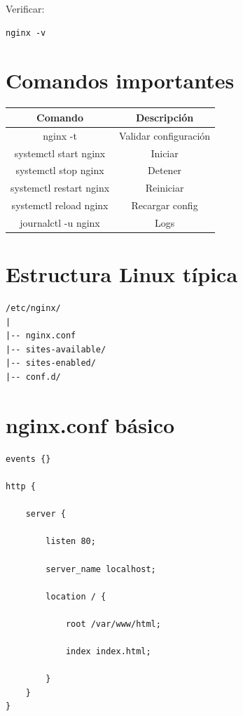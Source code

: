 \documentclass[a4paper,11pt]{article}
\begin{document}
Verificar:
\begin{lstlisting}
nginx -v
\end{lstlisting}


\section*{Comandos importantes}

\begin{center}
\begin{tabular}{| c | c |}
\hline
Comando & Descripción \\
\hline\hline
nginx -t & Validar configuración \\
\hline
systemctl start nginx & Iniciar \\
\hline
systemctl stop nginx & Detener \\
\hline
systemctl restart nginx & Reiniciar \\
\hline
systemctl reload nginx & Recargar config \\
\hline
journalctl -u nginx & Logs \\
\hline
\end{tabular}
\end{center}


\section*{Estructura Linux típica}

\begin{lstlisting}
/etc/nginx/
|
|-- nginx.conf
|-- sites-available/
|-- sites-enabled/
|-- conf.d/
\end{lstlisting}


\section*{nginx.conf básico}

\begin{lstlisting}
events {}

http {

    server {

        listen 80;

        server_name localhost;

        location / {

            root /var/www/html;

            index index.html;

        }
    }
}
\end{lstlisting}
\end{document}
